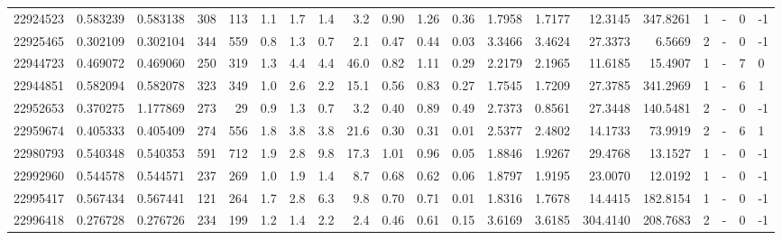 \begin{tabular}{rrrrrrrrrrrrrrrrrlrl}
  22924523 & 0.583239 &   0.583138 &  308 &  113 &      1.1 &      1.7 &     1.4 &      3.2 &       0.90 &        1.26 &        0.36 &  1.7958 &  1.7177 &   12.3145 &  347.8261 &       1 &             - &        0 &        -1 \\
  22925465 & 0.302109 &   0.302104 &  344 &  559 &      0.8 &      1.3 &     0.7 &      2.1 &       0.47 &        0.44 &        0.03 &  3.3466 &  3.4624 &   27.3373 &    6.5669 &       2 &             - &        0 &        -1 \\
  22944723 & 0.469072 &   0.469060 &  250 &  319 &      1.3 &      4.4 &     4.4 &     46.0 &       0.82 &        1.11 &        0.29 &  2.2179 &  2.1965 &   11.6185 &   15.4907 &       1 &             - &        7 &         0 \\
  22944851 & 0.582094 &   0.582078 &  323 &  349 &      1.0 &      2.6 &     2.2 &     15.1 &       0.56 &        0.83 &        0.27 &  1.7545 &  1.7209 &   27.3785 &  341.2969 &       1 &             - &        6 &         1 \\
  22952653 & 0.370275 &   1.177869 &  273 &   29 &      0.9 &      1.3 &     0.7 &      3.2 &       0.40 &        0.89 &        0.49 &  2.7373 &  0.8561 &   27.3448 &  140.5481 &       2 &             - &        0 &        -1 \\
  22959674 & 0.405333 &   0.405409 &  274 &  556 &      1.8 &      3.8 &     3.8 &     21.6 &       0.30 &        0.31 &        0.01 &  2.5377 &  2.4802 &   14.1733 &   73.9919 &       2 &             - &        6 &         1 \\
  22980793 & 0.540348 &   0.540353 &  591 &  712 &      1.9 &      2.8 &     9.8 &     17.3 &       1.01 &        0.96 &        0.05 &  1.8846 &  1.9267 &   29.4768 &   13.1527 &       1 &             - &        0 &        -1 \\
  22992960 & 0.544578 &   0.544571 &  237 &  269 &      1.0 &      1.9 &     1.4 &      8.7 &       0.68 &        0.62 &        0.06 &  1.8797 &  1.9195 &   23.0070 &   12.0192 &       1 &             - &        0 &        -1 \\
  22995417 & 0.567434 &   0.567441 &  121 &  264 &      1.7 &      2.8 &     6.3 &      9.8 &       0.70 &        0.71 &        0.01 &  1.8316 &  1.7678 &   14.4415 &  182.8154 &       1 &             - &        0 &        -1 \\
  22996418 & 0.276728 &   0.276726 &  234 &  199 &      1.2 &      1.4 &     2.2 &      2.4 &       0.46 &        0.61 &        0.15 &  3.6169 &  3.6185 &  304.4140 &  208.7683 &       2 &             - &        0 &        -1 \\

\end{tabular}
